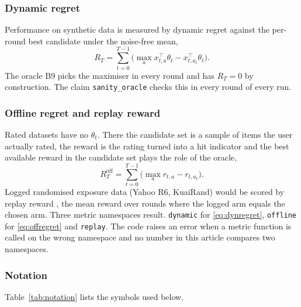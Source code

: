 \subsubsection*{Dynamic regret}
Performance on synthetic data is measured by dynamic regret against the per-round best candidate under the noise-free mean,
\begin{equation}
R_T=\sum_{t=0}^{T-1}\Big(\max_a x_{t,a}^\top\theta_t-x_{t,a_t}^\top\theta_t\Big).
\label{eq:dynregret}
\end{equation}
The oracle B9 picks the maximiser in every round and has $R_T=0$ by construction. The claim \texttt{sanity\_oracle} checks this in every round of every run.

\subsubsection*{Offline regret and replay reward}
Rated datasets have no $\theta_t$. There the candidate set is a sample of items the user actually rated, the reward is the rating turned into a hit indicator and the best available reward in the candidate set plays the role of the oracle,
\begin{equation}
R^{\mathrm{off}}_T=\sum_{t=0}^{T-1}\Big(\max_{a}r_{t,a}-r_{t,a_t}\Big).
\label{eq:offregret}
\end{equation}
Logged randomised exposure data (Yahoo R6, KuaiRand) would be scored by replay reward \cite{li2011}, the mean reward over rounds where the logged arm equals the chosen arm. Three metric namespaces result. \texttt{dynamic} for \eqref{eq:dynregret}, \texttt{offline} for \eqref{eq:offregret} and \texttt{replay}. The code raises an error when a metric function is called on the wrong namespace and no number in this article compares two namespaces.

\subsubsection*{Notation}
Table~\ref{tab:notation} lists the symbols used below.

